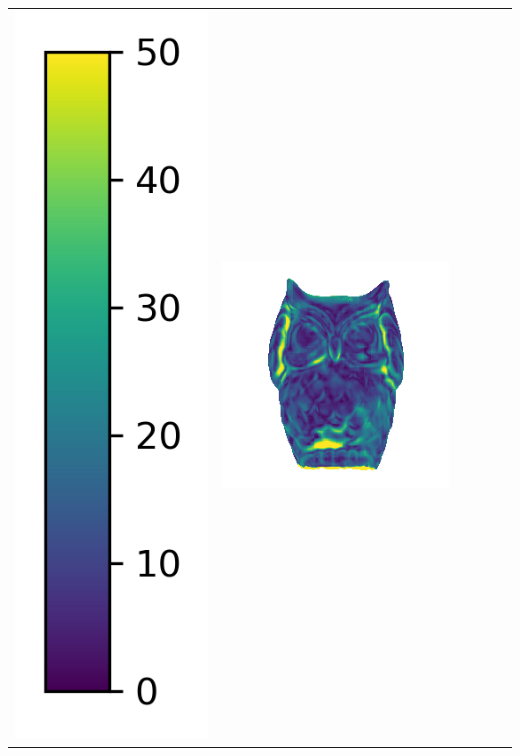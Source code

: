 \begin{center}
\begin{tabularx}{\linewidth}{@{}Y@{}Y@{}Y@{}Y@{}Y@{}Y@{}}
\includegraphics[width=0.2\linewidth]{semisynthetic/colorbar_error_vertical.png} &
\includegraphics[width=\linewidth]{semisynthetic/20160617_15_ours_err.png} &

\end{tabularx}
\end{center}
